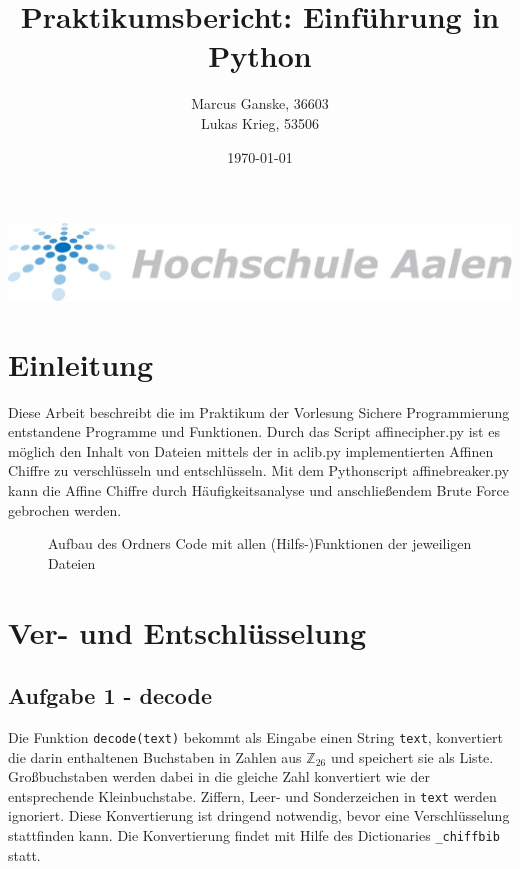 \documentclass[12pt]{article}
\title{Praktikumsbericht: Einf\"uhrung in Python}
\author{Marcus Ganske, 36603\\
		Lukas Krieg, 53506}
\date{\today}
\begin{document}
\maketitle
\vspace{+8cm}{
}
\includegraphics[width=15cm]{Hochschule-aalen.pdf}

\newpage
\renewcommand\contentsname{Inhaltsverzeichnis}
\tableofcontents
\newpage
	
	\section{Einleitung}
		Diese Arbeit beschreibt die im Praktikum der Vorlesung Sichere Programmierung  entstandene Programme und Funktionen. Durch das Script affinecipher.py ist es möglich den Inhalt von Dateien mittels der in aclib.py implementierten Affinen Chiffre zu verschlüsseln und entschlüsseln. Mit dem Pythonscript affinebreaker.py kann die Affine Chiffre durch H\"aufigkeitsanalyse und anschlie{\ss}endem Brute Force gebrochen werden.
		\begin{figure}[H]
		\caption{Aufbau des Ordners Code mit allen (Hilfs-)Funktionen der jeweiligen Dateien}
	\end{figure}
		
	\section{Ver- und Entschl\"usselung}
		\subsection{\label{ssec:Aufgabe1}Aufgabe 1 - decode}
			Die Funktion \texttt{decode(text)} bekommt als Eingabe einen String \texttt{text}, konvertiert die darin enthaltenen Buchstaben in Zahlen aus \(\mathbb{Z}_{26}\) und speichert sie als Liste. Gro{\ss}buchstaben werden dabei in die gleiche Zahl konvertiert wie der entsprechende Kleinbuchstabe. Ziffern, Leer- und Sonderzeichen in \texttt{text} werden ignoriert. Diese Konvertierung ist dringend notwendig, bevor eine Verschl\"usselung stattfinden kann. Die Konvertierung findet mit Hilfe des Dictionaries \texttt{\_chiffbib} statt.
\end{document}
